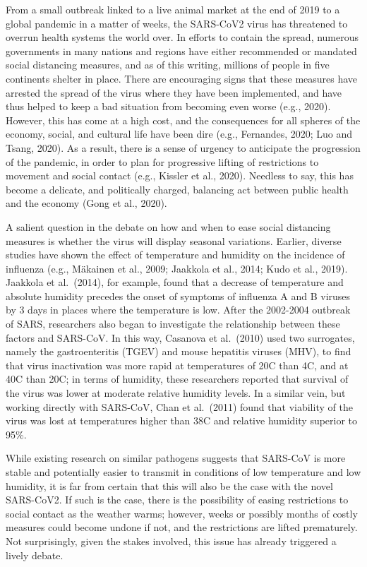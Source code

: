 \documentclass[]{elsarticle} %
\begin{document}
From a small outbreak linked to a live animal market at the end of 2019
to a global pandemic in a matter of weeks, the SARS-CoV2 virus has
threatened to overrun health systems the world over. In efforts to
contain the spread, numerous governments in many nations and regions
have either recommended or mandated social distancing measures, and as
of this writing, millions of people in five continents shelter in place.
There are encouraging signs that these measures have arrested the spread
of the virus where they have been implemented, and have thus helped to
keep a bad situation from becoming even worse (e.g., 2020). However,
this has come at a high cost, and the consequences for all spheres of
the economy, social, and cultural life have been dire (e.g., Fernandes,
2020; Luo and Tsang, 2020). As a result, there is a sense of urgency to
anticipate the progression of the pandemic, in order to plan for
progressive lifting of restrictions to movement and social contact
(e.g., Kissler et al., 2020). Needless to say, this has become a
delicate, and politically charged, balancing act between public health
and the economy (Gong et al., 2020).

A salient question in the debate on how and when to ease social
distancing measures is whether the virus will display seasonal
variations. Earlier, diverse studies have shown the effect of
temperature and humidity on the incidence of influenza (e.g., Mäkainen
et al., 2009; Jaakkola et al., 2014; Kudo et al., 2019). Jaakkola et
al.~(2014), for example, found that a decrease of temperature and
absolute humidity precedes the onset of symptoms of influenza A and B
viruses by 3 days in places where the temperature is low. After the
2002-2004 outbreak of SARS, researchers also began to investigate the
relationship between these factors and SARS-CoV. In this way, Casanova
et al.~(2010) used two surrogates, namely the gastroenteritis (TGEV) and
mouse hepatitis viruses (MHV), to find that virus inactivation was more
rapid at temperatures of 20C than 4C, and at 40C than 20C; in terms of
humidity, these researchers reported that survival of the virus was
lower at moderate relative humidity levels. In a similar vein, but
working directly with SARS-CoV, Chan et al.~(2011) found that viability
of the virus was lost at temperatures higher than 38C and relative
humidity superior to 95\%.

While existing research on similar pathogens suggests that SARS-CoV is
more stable and potentially easier to transmit in conditions of low
temperature and low humidity, it is far from certain that this will also
be the case with the novel SARS-CoV2. If such is the case, there is the
possibility of easing restrictions to social contact as the weather
warms; however, weeks or possibly months of costly measures could become
undone if not, and the restrictions are lifted prematurely. Not
surprisingly, given the stakes involved, this issue has already
triggered a lively debate.
\end{document}
